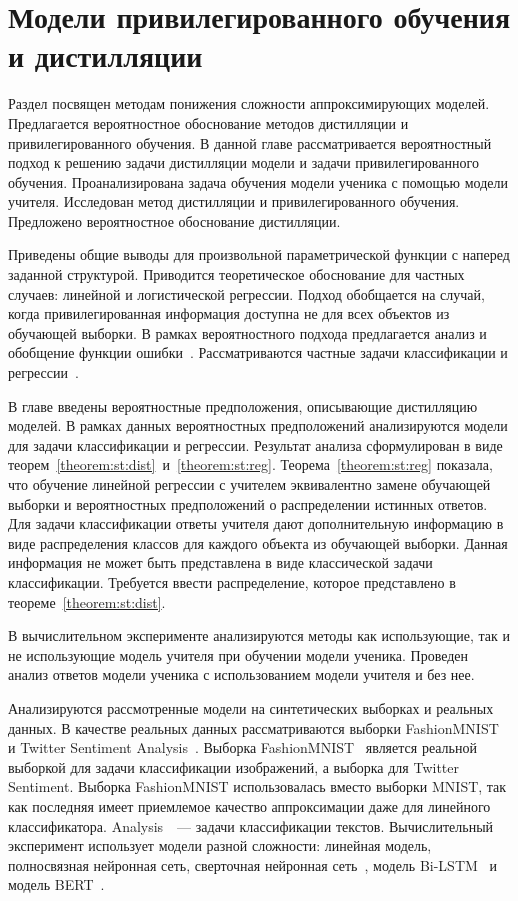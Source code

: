 \chapter{Модели привилегированного обучения и дистилляции}

Раздел посвящен методам понижения сложности аппроксимирующих моделей. Предлагается вероятностное обоснование методов дистилляции и привилегированного обучения.
В данной главе рассматривается вероятностный подход к решению задачи дистилляции модели и задачи привилегированного обучения.
Проанализирована задача обучения модели ученика с помощью модели учителя. Исследован метод дистилляции и привилегированного обучения.
Предложено вероятностное обоснование дистилляции.

Приведены общие выводы для произвольной параметрической функции с наперед заданной структурой.
Приводится теоретическое обоснование для частных случаев: линейной и логистической регрессии.
Подход обобщается на случай, когда привилегированная информация доступна не для всех объектов из обучающей выборки.
В рамках вероятностного подхода предлагается анализ и обобщение функции ошибки~\cite{Hinton2015, Lopez2016}.
Рассматриваются частные задачи классификации и регрессии~\cite{Ivakhnenko1994}.

В главе введены вероятностные предположения, описывающие дистилляцию моделей.
В рамках данных вероятностных предположений анализируются модели для задачи классификации и регрессии.
Результат анализа сформулирован в виде теорем~\ref{theorem:st:dist}~и~\ref{theorem:st:reg}.
Теорема~\ref{theorem:st:reg} показала, что обучение линейной регрессии с учителем эквивалентно замене обучающей выборки и вероятностных предположений о распределении истинных ответов.
Для задачи классификации ответы учителя дают дополнительную информацию в виде распределения классов для каждого объекта из обучающей выборки.
Данная информация не может быть представлена в виде классической задачи классификации. Требуется ввести распределение, которое представлено в теореме~\ref{theorem:st:dist}.

В вычислительном эксперименте анализируются методы как использующие, так и не использующие модель учителя при обучении модели ученика. Проведен анализ ответов модели ученика с использованием модели учителя и без нее.

Анализируются рассмотренные модели на синтетических выборках и реальных данных. В качестве реальных данных рассматриваются выборки FashionMNIST~\cite{fashionmnist} и Twitter Sentiment Analysis~\cite{twiter2013}. Выборка FashionMNIST~\cite{fashionmnist} является реальной выборкой для задачи классификации изображений, а выборка для Twitter Sentiment. Выборка FashionMNIST использовалась вместо выборки MNIST, так как последняя имеет приемлемое качество аппроксимации даже для линейного классификатора. Analysis~\cite{twiter2013}~--- задачи классификации текстов. Вычислительный эксперимент использует модели разной сложности: линейная модель, полносвязная нейронная сеть, сверточная нейронная сеть~\cite{LeCun1989}, модель Bi-LSTM~\cite{Schmidhuber1997} и модель BERT~\cite{Devlin2018}.


